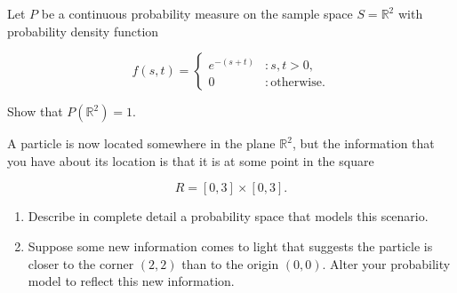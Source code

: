 \documentclass[12pt,reqno]{amsart}
\begin{document}
\prob Let $P$ be a continuous probability measure on the sample space $S=\mathbb{R}^2$ with probability density function

	\[
	f(s,t) = \begin{cases}
	e^{-(s+t)} & : s,t >0, \\
	0 & : \text{otherwise}.    
	\end{cases}
	\]

Show that $P(\mathbb{R}^2)=1$.\vfill

















\newpage
\prob A particle is now located somewhere in the plane $\mathbb{R}^2$, but the  information that you have about its location is that it is at some point in the square

	\[
	R = [0,3] \times [0,3].
	\]

\medskip
\begin{enumerate}
\item Describe in complete detail a probability space that models this scenario.\vfill
\item Suppose some new information comes to light that suggests the particle is closer to the corner $(2,2)$ than to the origin $(0,0)$. Alter your probability model to reflect this new information.\vfill
\end{enumerate}
    
   
\end{document}
